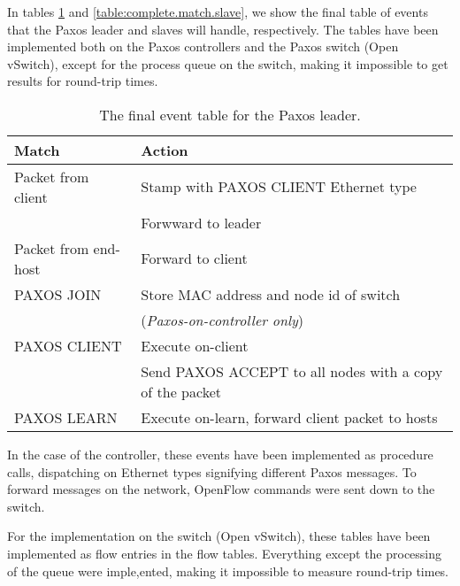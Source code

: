 In tables \ref{table:complete.match.leader} and
\ref{table:complete.match.slave}, we show the final table of events that the
Paxos leader and slaves will handle, respectively.
%
The tables have been implemented both on the Paxos controllers and the Paxos
switch (Open vSwitch), except for the process queue on the switch, making it
impossible to get results for round-trip times.

\begin{table}[H]
  \centering
  \begin{tabular}{|l|l|}
    \hline \textbf{Match} & \textbf{Action} \\
    \hline Packet from client & Stamp with PAXOS CLIENT Ethernet type \\
                       & Forwward to leader \\
    \hline Packet from end-host & Forward to client \\
    \hline PAXOS JOIN  & Store MAC address and node id of switch \\
                       & (\textit{Paxos-on-controller only}) \\
    \hline PAXOS CLIENT & Execute on-client \\
                        & Send PAXOS ACCEPT to all nodes with a copy of the
                        packet \\
    \hline PAXOS LEARN & Execute on-learn, forward client packet to hosts  \\
    \hline
  \end{tabular}
  \caption{The final event table for the Paxos leader.}
  \label{table:complete.match.leader}
\end{table}

In the case of the controller, these events have been implemented as
procedure calls, dispatching on Ethernet types signifying different Paxos
messages.  To forward messages on the network, OpenFlow commands were sent
down to the switch.

For the implementation on the switch (Open vSwitch), these tables have been
implemented as flow entries in the flow tables.  Everything except the
processing of the queue were imple,ented, making it impossible to measure
round-trip times.

